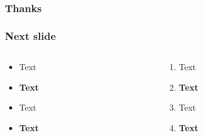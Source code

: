 \documentclass{beamer}
\begin{document}
\begin{frame}
  \frametitle{Thanks}
\end{frame}

\begin{frame}
  \frametitle{Next slide}
  \begin{columns}[onlytextwidth]
    \begin{column}{0.5\textwidth}
      \begin{itemize}
        \item Text
        \item \textbf{Text}
          \item \textcolor{cvut_navy}{Text}
          \item \textcolor{cvut_navy}{\textbf{Text}}
      \end{itemize}
    \end{column}

      \begin{column}{0.5\textwidth}
       \begin{enumerate}
        \item Text
        \item \textbf{Text}
          \item \textcolor{cvut_navy}{Text}
          \item \textcolor{cvut_navy}{\textbf{Text}}
      \end{enumerate}
    \end{column}
  \end{columns}
\end{frame}
\end{document}
